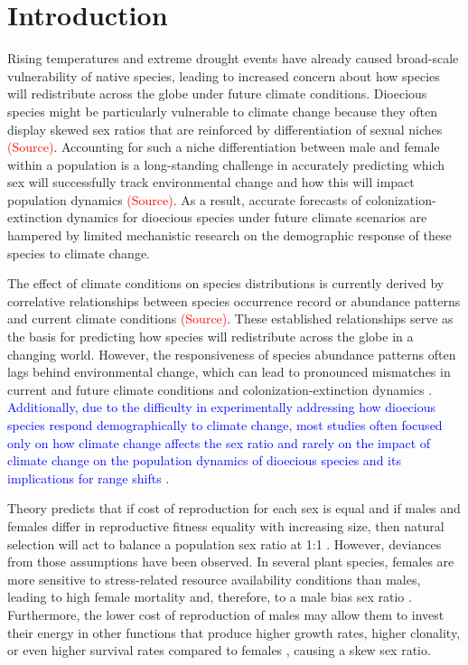 \documentclass[11pt]{article}
\begin{document}
\section*{Introduction}
Rising temperatures and extreme drought events have already caused broad-scale vulnerability of native species, leading to increased concern about how species will redistribute across the globe under future climate conditions.
Dioecious species might be particularly vulnerable to climate change because they often display skewed sex ratios that are reinforced by differentiation of sexual niches \textcolor{red}{(Source)}. 
Accounting for such a niche differentiation between male and female within a population is a long-standing challenge in accurately predicting which sex will successfully track environmental change and how this will impact population dynamics \textcolor{red}{(Source)}. 
As a result, accurate forecasts of colonization-extinction dynamics for dioecious species under future climate scenarios are hampered by limited mechanistic research on the demographic response of these species to climate change.

The effect of climate conditions on species distributions is currently derived by correlative relationships between species occurrence record or abundance patterns and current climate conditions \textcolor{red}{(Source)}.  
These established relationships serve as the basis for predicting how species will redistribute across the globe in a changing world. 
However, the responsiveness of species abundance patterns often lags behind environmental change, which can lead to pronounced mismatches in current and future climate conditions and colonization-extinction dynamics \citep{a2022species}. 
\textcolor{blue} {Additionally, due to the difficulty in experimentally addressing how dioecious species respond demographically to climate change, most studies often focused only on how climate change affects the sex ratio and rarely on the impact of climate change on the population dynamics of dioecious species and its implications for range shifts }.  

Theory predicts that if cost of reproduction for each sex is equal and if males and females differ in reproductive fitness equality with increasing size, then natural selection will act to balance a population sex ratio at 1:1 \citep{Fisher1930}.  However, deviances from those assumptions have been observed.
In several plant species, females are more sensitive to stress-related resource availability conditions than males, leading to high female mortality and, therefore, to a male bias sex ratio \citep{hultine2016climate}. 
Furthermore, the lower cost of reproduction of males may allow them to invest their energy in other functions that produce higher growth rates, higher clonality, or even higher survival rates compared to females \citep{bruijning2017surviving}, causing a skew sex ratio.
\end{document}
